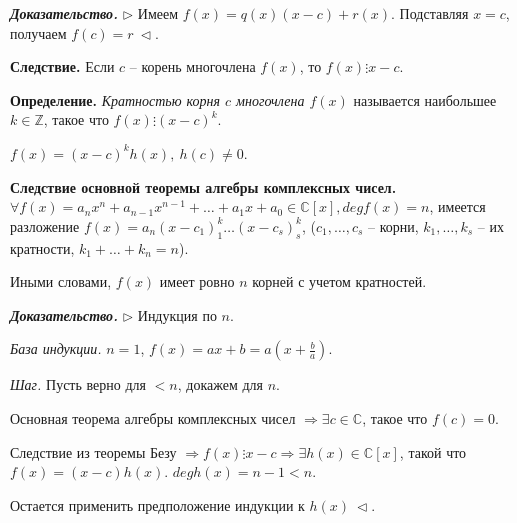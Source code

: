 \vspace{\baselineskip}
\textbf{\textit{Доказательство.}} $\rhd$ Имеем $f(x) = q(x)(x - c) + r(x)$. Подставляя $x=c$, получаем $f(c) = r \ \lhd$.

\vspace{\baselineskip}
\textbf{Следствие.} Если $c$ -- корень многочлена $f(x)$, то $f(x) \vdots x - c$.

\vspace{\baselineskip}
\textbf{Определение.} \textit{Кратностью корня $c$ многочлена $f(x)$} называется наибольшее $k \in \mathbb{Z}$, такое что $f(x) \vdots (x - c)^k$.

$f(x) = (x - c)^k h(x), \ h(c) \neq 0$.

\vspace{\baselineskip}
\textbf{Следствие основной теоремы алгебры комплексных чисел.} $\forall f(x) = a_n x^n + a_{n-1} x^{n-1} + \dots + a_1 x + a_0 \in \mathbb{C}[x], deg f(x) = n$, имеется разложение $f(x) = a_n (x - c_1)^k_1
\dots (x - c_s)^k_s$, ($c_1, \dots, c_s$ -- корни, $k_1, \dots, k_s$ -- их кратности, $k_1 + \dots + k_n = n$).

\vspace{\baselineskip}
Иными словами, $f(x)$ имеет ровно $n$ корней с учетом кратностей.

\vspace{\baselineskip}
\textbf{\textit{Доказательство.}} $\rhd$ Индукция по $n$.

\textit{База индукции.} $n = 1$, $f(x) = ax + b = a (x + \frac{b}{a})$.

\textit{Шаг.} Пусть верно для $<n$, докажем для $n$.

Основная теорема алгебры комплексных чисел $\Rightarrow \exists c \in \mathbb{C}$, такое что $f(c) = 0$.

Следствие из теоремы Безу $\Rightarrow f(x) \vdots x - c \Rightarrow \exists h(x) \in \mathbb{C}[x]$, такой что $f(x) = (x-c)h(x)$. $degh(x) = n-1 < n$.

Остается применить предположение индукции к $h(x) \ \lhd$.


